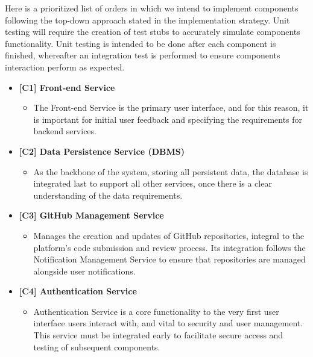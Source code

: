 Here is a prioritized list of orders in which we intend to implement components following the top-down approach stated in the implementation strategy. Unit testing will require the creation of test stubs to accurately simulate components functionality. Unit testing is intended to be done after each component is finished, whereafter an integration test is performed to ensure components interaction perform as expected. 

\begin{itemize}

    \renewcommand{\labelitemi}{}

    \item \textbf{[C1] Front-end Service}
    \begin{itemize}
        \item The Front-end Service is the primary user interface, and for this reason, it is important for initial user feedback and specifying the requirements for backend services.
    \end{itemize}


    \item \textbf{[C2] Data Persistence Service (DBMS)}
    \begin{itemize}
        \item As the backbone of the system, storing all persistent data, the database is integrated last to support all other services, once there is a clear understanding of the data requirements.
    \end{itemize}

    \item \textbf{[C3] GitHub Management Service}
    \begin{itemize}
        \item Manages the creation and updates of GitHub repositories, integral to the platform's code submission and review process. Its integration follows the Notification Management Service to ensure that repositories are managed alongside user notifications.
    \end{itemize}

    \item \textbf{[C4] Authentication Service}
    \begin{itemize}
        \item Authentication Service is a core functionality to the very first user interface users interact with, and vital to security and user management. This service must be integrated early to facilitate secure access and testing of subsequent components.
    \end{itemize}


\end{itemize}
